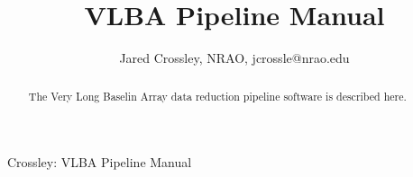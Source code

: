 \documentclass[10pt,onecolumn,final]{IEEEtran}
\begin{document}
%
\title{VLBA Pipeline Manual}
%
%
%

\author{Jared Crossley, NRAO, jcrossle@nrao.edu}

%
{Crossley: VLBA Pipeline Manual}
% 











\maketitle


\begin{abstract}
The Very Long Baselin Array data reduction pipeline software is described here.
\end{abstract}
\end{document}
